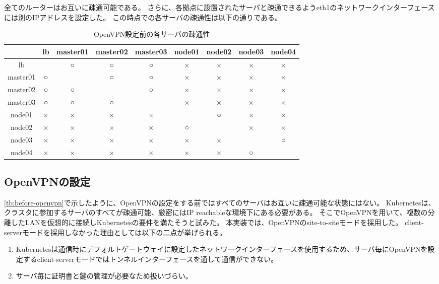 全てのルーターはお互いに疎通可能である。
さらに、各拠点に設置されたサーバと疎通できるようeth1のネットワークインターフェースには別のIPアドレスを設定した。
この時点での各サーバの疎通性は以下の通りである。

\begin{table}[htb]
  \begin{center}
    \caption{OpenVPN設定前の各サーバの疎通性}
    \begin{tabular}{|c|c|c|c|c|c|c|c|c|} \hline
      & lb & master01 & master02 & master03 & node01 & node02 & node03 & node04 \\ \hline
      lb & \ & ○ & ○ & ○ & × & × & × & × \\ \hline
      master01 & ○ & \ & ○ & ○ & × & × & × & × \\ \hline
      master02 & ○ & ○ & \ & ○ & × & × & × & × \\ \hline
      master03 & ○ & ○ & ○ & \ & × & × & × & × \\ \hline
      node01 & × & × & × & × & \ & ○ & × & × \\ \hline
      node02 & × & × & × & × & ○ & \ & × & × \\ \hline
      node03 & × & × & × & × & × & × & \ & ○ \\ \hline
      node04 & × & × & × & × & × & × & ○ & \ \\ \hline
    \end{tabular}
  \end{center}
\end{table}
\label{tb:before-openvpn}

\subsection{OpenVPNの設定}

\ref{tb:before-openvpn}で示したように、OpenVPNの設定をする前ではすべてのサーバはお互いに疎通可能な状態にはない。
Kubernetesは、クラスタに参加するサーバのすべてが疎通可能、厳密にはIP reachableな環境下にある必要がある。
そこでOpenVPNを用いて、複数の分離したLANを仮想的に接続しKubernetesの要件を満たそうと試みた。
本実装では、OpenVPNのsite-to-siteモードを採用した。
client-serverモードを採用しなかった理由としては以下の二点が挙げられる。

\begin{enumerate}
  \item Kubernetesは通信時にデフォルトゲートウェイに設定したネットワークインターフェースを使用するため、サーバ毎にOpenVPNを設定するclient-serverモードではトンネルインターフェースを通して通信ができない。
  \item サーバ毎に証明書と鍵の管理が必要なため扱いづらい。
\end{enumerate}

